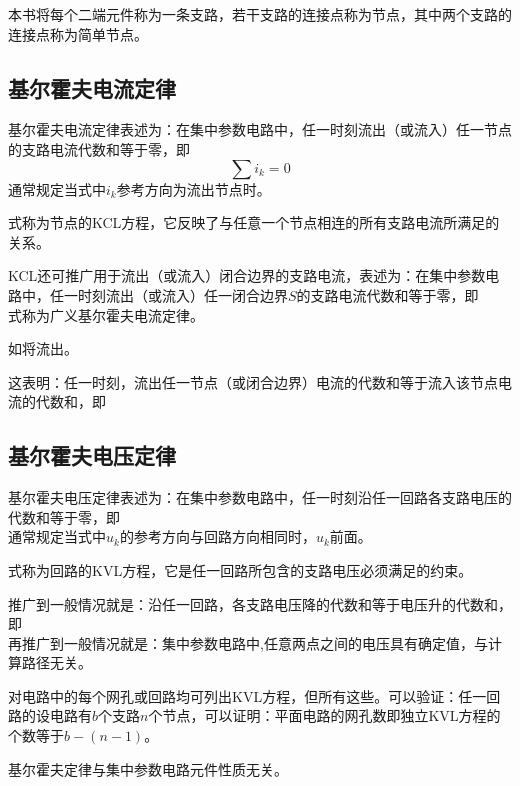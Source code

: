 本书将每个二端元件称为一条支路，若干支路的连接点称为节点，其中两个支路的连接点称为简单节点。

\subsection{基尔霍夫电流定律}
基尔霍夫电流定律表述为：在集中参数电路中，任一时刻流出（或流入）任一节点的支路电流代数和等于零，即
\[
\sum i_k=0
\]
通常规定当式中$i_k$参考方向为流出节点时。

式称为节点的KCL方程，它反映了与任意一个节点相连的所有支路电流所满足的关系。

KCL还可推广用于流出（或流入）闭合边界的支路电流，表述为：在集中参数电路中，任一时刻流出（或流入）任一闭合边界$S$的支路电流代数和等于零，即
\[
\]
式称为广义基尔霍夫电流定律。

如将流出。

这表明：任一时刻，流出任一节点（或闭合边界）电流的代数和等于流入该节点电流的代数和，即
\[
\]

\subsection{基尔霍夫电压定律}
基尔霍夫电压定律表述为：在集中参数电路中，任一时刻沿任一回路各支路电压的代数和等于零，即
\[
\]
通常规定当式中$u_k$的参考方向与回路方向相同时，$u_k$前面。

式称为回路的KVL方程，它是任一回路所包含的支路电压必须满足的约束。

推广到一般情况就是：沿任一回路，各支路电压降的代数和等于电压升的代数和，即
\[
\]
再推广到一般情况就是：集中参数电路中,任意两点之间的电压具有确定值，与计算路径无关。

对电路中的每个网孔或回路均可列出KVL方程，但所有这些。可以验证：任一回路的设电路有$b$个支路$n$个节点，可以证明：平面电路的网孔数即独立KVL方程的个数等于$b-(n-1)$。

基尔霍夫定律与集中参数电路元件性质无关。

\endinput